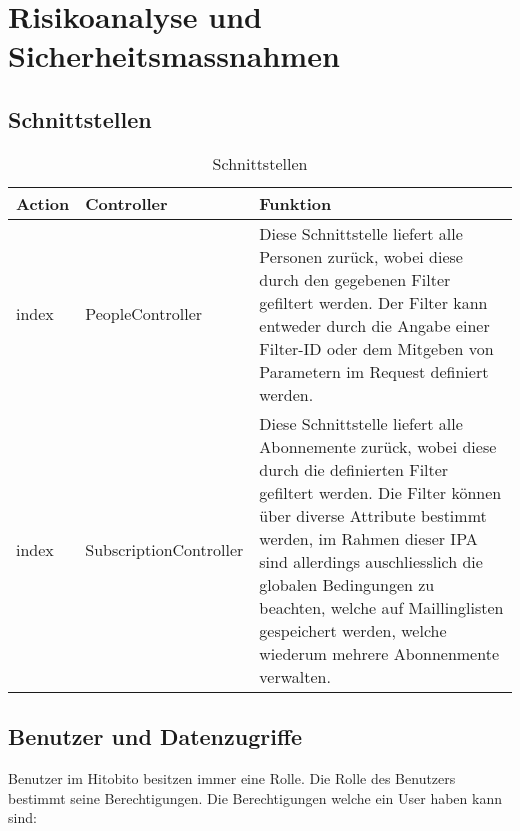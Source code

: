 \chapter{Risikoanalyse und Sicherheitsmassnahmen}
\section{Schnittstellen}

\begin{table}[h!]
  \begin{tabular}{|L{0.2\textwidth}|L{0.3\textwidth}|L{0.4\textwidth}|}
      \color{white} Action & \color{white} Controller & \color{white} Funktion \\ [12pt]
      \hline
      index & PeopleController & Diese Schnittstelle liefert alle Personen zurück, wobei diese durch den gegebenen Filter gefiltert werden.
      Der Filter kann entweder durch die Angabe einer Filter-ID oder dem Mitgeben von Parametern im Request definiert werden.  \\
      \hline
       index & SubscriptionController & Diese Schnittstelle liefert alle Abonnemente zurück, wobei diese durch die definierten Filter
       gefiltert werden. Die Filter können über diverse Attribute bestimmt werden, im Rahmen dieser IPA sind allerdings auschliesslich die
       globalen Bedingungen zu beachten, welche auf Maillinglisten gespeichert werden, welche wiederum mehrere Abonnenmente verwalten.  \\
      \hline
    \end{tabular}
    \caption{Schnittstellen}
\end{table}

\newpage

\section{Benutzer und Datenzugriffe}
Benutzer im Hitobito besitzen immer eine Rolle. Die Rolle des Benutzers bestimmt seine Berechtigungen. Die Berechtigungen welche ein User haben kann sind:

